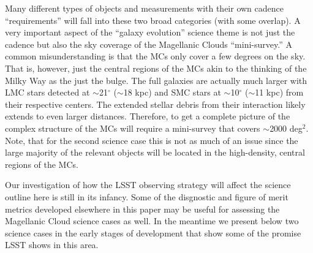 Many different types of objects and measurements with their own
cadence ``requirements'' will fall into these two broad categories
(with some overlap).
A very important aspect of the ``galaxy evolution'' science theme is
not just the cadence but also the sky coverage of the Magellanic
Clouds ``mini-survey.''  A common misunderstanding is that the MCs
only cover a few degrees on the sky.  That is, however, just the
central regions of the MCs akin to the thinking of the Milky Way as
the just the bulge.  The full galaxies are actually much larger with
LMC stars detected at $\sim$21$^{\circ}$ ($\sim$18 kpc) and SMC stars
at $\sim$10$^{\circ}$ ($\sim$11 kpc) from their respective centers.
The extended stellar debris from their interaction likely extends to
even larger distances.  Therefore, to get a complete picture of the
complex structure of the MCs will require a mini-survey that covers
$\sim$2000 deg$^2$.
Note, that for the second science case
this is not as much of an issue since the large majority of the
relevant objects will be located in the high-density, central regions
of the MCs.

Our investigation of how the LSST observing strategy will affect the
science outline here is still in its infancy. Some of the disgnostic and
figure of merit metrics developed elsewhere in this paper may be useful
for assessing the Magellanic Cloud science cases as well. In the
meantime we present below two science cases in the early stages of development that show some of the promise LSST shows in this area.




